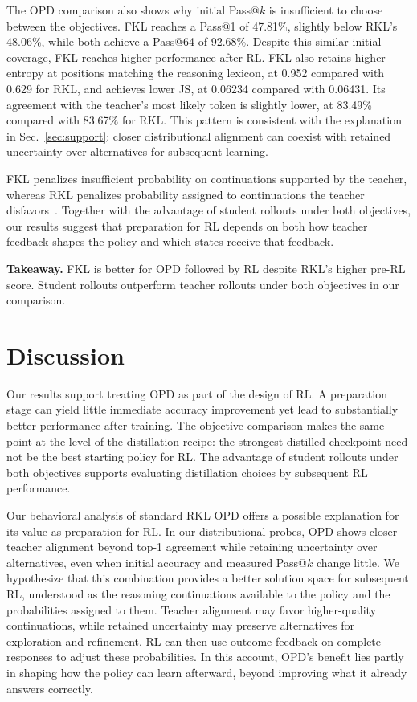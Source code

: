 \documentclass[]{jingdong}
\theoremstyle{plain}
\theoremstyle{definition}
\theoremstyle{remark}
\begin{document}
The OPD comparison also shows why initial Pass@$k$ is insufficient to choose between the objectives. FKL reaches a Pass@1 of 47.81\%, slightly below RKL's 48.06\%, while both achieve a Pass@64 of 92.68\%. Despite this similar initial coverage, FKL reaches higher performance after RL. FKL also retains higher entropy at positions matching the reasoning lexicon, at 0.952 compared with 0.629 for RKL, and achieves lower JS, at 0.06234 compared with 0.06431. Its agreement with the teacher's most likely token is slightly lower, at 83.49\% compared with 83.67\% for RKL. This pattern is consistent with the explanation in Sec.~\ref{sec:support}: closer distributional alignment can coexist with retained uncertainty over alternatives for subsequent learning.

FKL penalizes insufficient probability on continuations supported by the teacher, whereas RKL penalizes probability assigned to continuations the teacher disfavors~\citep{agarwal2024gkd,gu2024minillm}. Together with the advantage of student rollouts under both objectives, our results suggest that preparation for RL depends on both how teacher feedback shapes the policy and which states receive that feedback.

\begin{takeaway}
\textbf{Takeaway.} FKL is better for OPD followed by RL despite RKL's higher pre-RL score. Student rollouts outperform teacher rollouts under both objectives in our comparison.
\end{takeaway}

\section{Discussion}
\label{sec:discussion}

Our results support treating OPD as part of the design of RL. A preparation stage can yield little immediate accuracy improvement yet lead to substantially better performance after training. The objective comparison makes the same point at the level of the distillation recipe: the strongest distilled checkpoint need not be the best starting policy for RL. The advantage of student rollouts under both objectives supports evaluating distillation choices by subsequent RL performance.

Our behavioral analysis of standard RKL OPD offers a possible explanation for its value as preparation for RL. In our distributional probes, OPD shows closer teacher alignment beyond top-1 agreement while retaining uncertainty over alternatives, even when initial accuracy and measured Pass@$k$ change little. We hypothesize that this combination provides a better solution space for subsequent RL, understood as the reasoning continuations available to the policy and the probabilities assigned to them. Teacher alignment may favor higher-quality continuations, while retained uncertainty may preserve alternatives for exploration and refinement. RL can then use outcome feedback on complete responses to adjust these probabilities. In this account, OPD's benefit lies partly in shaping how the policy can learn afterward, beyond improving what it already answers correctly.
\end{document}
